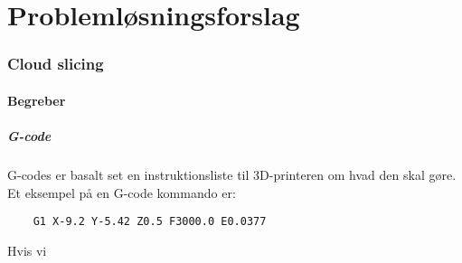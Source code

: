 \chapter{Problemløsningsforslag}

\subsection{Cloud slicing} %
\label{sub:cloud_slicing}

\subsubsection{Begreber} %
\label{ssub:begreber}

\paragraph{G-code} %
\label{par:g_code}

G-codes er basalt set en instruktionsliste til 3D-printeren om hvad den skal gøre. Et eksempel på en G-code kommando er:

\begin{verbatim}
	G1 X-9.2 Y-5.42 Z0.5 F3000.0 E0.0377
\end{verbatim}

Hvis vi



